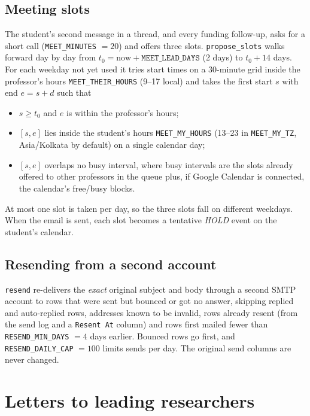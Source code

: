 \documentclass[11pt,a4paper]{article}
\newcommand{\code}[1]{\texttt{#1}}
\begin{document}
\subsection{Meeting slots}
The student's second message in a thread, and every funding follow-up, asks for a short call
(\code{MEET\_MINUTES} $= 20$) and offers three slots. \code{propose\_slots} walks forward day by
day from $t_0 = \text{now} + \code{MEET\_LEAD\_DAYS}$ (2 days) to $t_0 + 14$ days. For each
weekday not yet used it tries start times on a 30-minute grid inside the professor's hours
\code{MEET\_THEIR\_HOURS} (9--17 local) and takes the first start $s$ with end $e = s + d$ such
that
\begin{itemize}
  \item $s \ge t_0$ and $e$ is within the professor's hours;
  \item $[s, e]$ lies inside the student's hours \code{MEET\_MY\_HOURS} (13--23 in
        \code{MEET\_MY\_TZ}, Asia/Kolkata by default) on a single calendar day;
  \item $[s, e]$ overlaps no busy interval, where busy intervals are the slots already offered
        to other professors in the queue plus, if Google Calendar is connected, the calendar's
        free/busy blocks.
\end{itemize}
At most one slot is taken per day, so the three slots fall on different weekdays. When the
email is sent, each slot becomes a tentative \emph{HOLD} event on the student's calendar.

\subsection{Resending from a second account}
\code{resend} re-delivers the \emph{exact} original subject and body through a second SMTP
account to rows that were sent but bounced or got no answer, skipping replied and auto-replied
rows, addresses known to be invalid, rows already resent (from the send log and a
\code{Resent At} column) and rows first mailed fewer than \code{RESEND\_MIN\_DAYS} $= 4$ days
earlier. Bounced rows go first, and \code{RESEND\_DAILY\_CAP} $= 100$ limits sends per day. The
original send columns are never changed.

\section{Letters to leading researchers}
\end{document}
